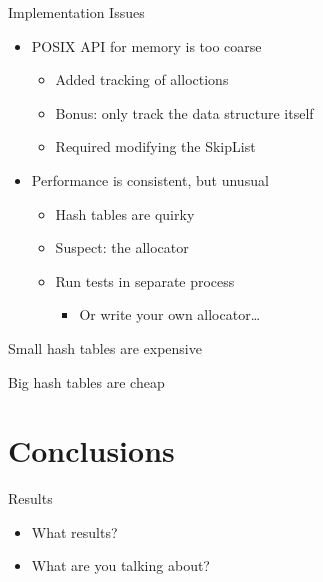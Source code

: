 \documentclass[10pt]{beamer}
\begin{document}
\begin{frame}{Implementation Issues}
    \begin{itemize}
        \item POSIX API for memory is too coarse
        \begin{itemize}
            \item Added tracking of alloctions
            \item Bonus: only track the data structure itself
            \item Required modifying the SkipList
        \end{itemize}
        \item Performance is consistent, but unusual
        \begin{itemize}
            \item Hash tables are quirky
            \item Suspect: the allocator
            \item Run tests in separate process
            \begin{itemize}
                \item Or write your own allocator\ldots
            \end{itemize}
        \end{itemize}
    \end{itemize}
\end{frame}

\begin{frame}{Small hash tables are expensive}

\end{frame}

\begin{frame}{Big hash tables are cheap}

\end{frame}

\section{Conclusions}

\begin{frame}{Results}
    \begin{itemize}
        \item What results?
        \item What are you talking about?
    \end{itemize}
\end{frame}
\end{document}
